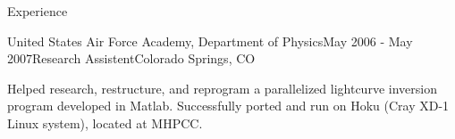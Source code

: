 \begin{rSection}{Experience}
\begin{rSubsection}{United States Air Force Academy, Department of Physics}{May 2006 - May 2007}{Research Assistent}{Colorado Springs, CO}
\item Helped research, restructure, and reprogram a parallelized lightcurve inversion program developed in Matlab.
Successfully ported and run on Hoku (Cray XD-1 Linux system), located at MHPCC.
\end{rSubsection}


\end{rSection}
